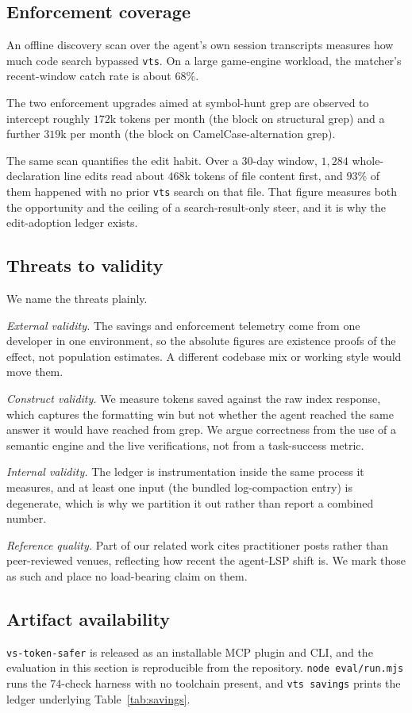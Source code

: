 \documentclass[11pt]{article}
\begin{document}
\subsection{Enforcement coverage}
An offline discovery scan over the agent's own session transcripts measures how much
code search bypassed \texttt{vts}. On a large game-engine workload, the matcher's
recent-window catch rate is about $68\%$.

The two enforcement upgrades aimed at symbol-hunt grep are observed to intercept
roughly $172$k tokens per month (the block on structural grep) and a further $319$k
per month (the block on CamelCase-alternation grep).

The same scan quantifies the edit habit. Over a 30-day window, $1{,}284$
whole-declaration line edits read about $468$k tokens of file content first, and
$93\%$ of them happened with no prior \texttt{vts} search on that file. That figure
measures both the opportunity and the ceiling of a search-result-only steer, and it
is why the edit-adoption ledger exists.

\subsection{Threats to validity}
We name the threats plainly.

\emph{External validity.} The savings and enforcement telemetry come from one
developer in one environment, so the absolute figures are existence proofs of the
effect, not population estimates. A different codebase mix or working style would
move them.

\emph{Construct validity.} We measure tokens saved against the raw index response,
which captures the formatting win but not whether the agent reached the same answer
it would have reached from grep. We argue correctness from the use of a semantic
engine and the live verifications, not from a task-success metric.

\emph{Internal validity.} The ledger is instrumentation inside the same process it
measures, and at least one input (the bundled log-compaction entry) is degenerate,
which is why we partition it out rather than report a combined number.

\emph{Reference quality.} Part of our related work cites practitioner posts rather
than peer-reviewed venues, reflecting how recent the agent-LSP shift is. We mark
those as such and place no load-bearing claim on them.

\subsection{Artifact availability}
\texttt{vs-token-safer} is released as an installable MCP plugin and CLI, and the
evaluation in this section is reproducible from the repository. \texttt{node
eval/run.mjs} runs the 74-check harness with no toolchain present, and \texttt{vts
savings} prints the ledger underlying Table~\ref{tab:savings}.
\end{document}
